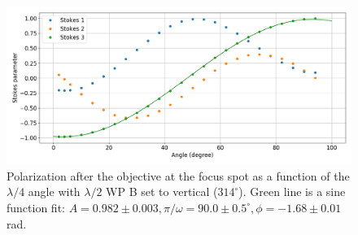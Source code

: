 \documentclass[english, a4paper, 12pt, twoside]{book}
\numberwithin{equation}{section} %
\begin{document}
\begin{appendices}
\begin{figure}[H]
\label{pol1}
\end{figure}
\begin{figure}[H]
\centering
\includegraphics[width = \textwidth]{pol2}
\caption{Polarization after the objective at the focus spot as a function of the $\lambda/4$ angle with $\lambda/2$ WP B set to vertical ($314^\circ$). Green line is a sine function fit: $A = 0.982 \pm 0.003,\pi/\omega = 90.0 \pm 0.5^\circ, \phi = -1.68\pm0.01$ rad.}
\label{pol2}
\end{figure}
\end{appendices}
\end{document}
